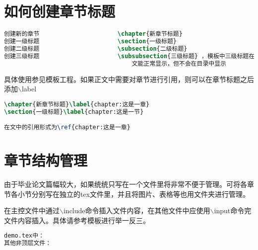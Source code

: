 \section{如何创建章节标题}
\begin{lstlisting}[language={tex}, caption={章节创建命令}]
创建新的章节						\chapter{新章节标题}
创建一级标题						\section{一级标题}
创建二级标题						\subsection{二级标题}
创建三级标题						\subsubsection{三级标题} ，模板中三级标题在正
									文能正常显示，但不会在目录中显示
\end{lstlisting}
具体使用参见模板工程。如果正文中需要对章节进行引用，则可以在章节标题之后添加$\backslash$label
\begin{lstlisting}[language={tex}, caption={添加标签}]
\chapter{新章节标题}\label{chapter:这是一章}
\section{一级标题}\label{chapter:这是一节}

在文中的引用形式为\ref{chapter:这是一章}
\end{lstlisting}
\section{章节结构管理}
由于毕业论文篇幅较大，如果统统只写在一个文件里将非常不便于管理。可将各章节各小节分别写在独立的tex文件里，并且将图片、表格等也用文件夹进行管理。

在主控文件中通过$\backslash$include命令插入文件内容，在其他文件中应使用$\backslash$input命令完文件内容插入。具体请参考模板进行举一反三。
\begin{lstlisting}[language={tex}, caption={如何包含文件}]
demo.tex中： 
其他非顶层文件：
\end{lstlisting}

